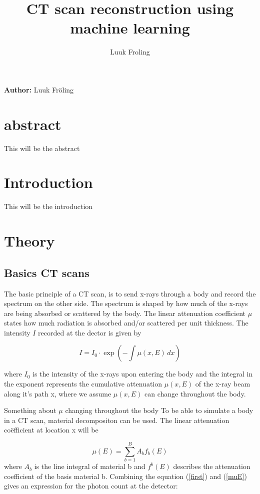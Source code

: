 \documentclass[9pt,Preprint]{lapreprint}
\title{CT scan reconstruction using machine learning}
\author[]{Luuk Froling}
\begin{document}
\maketitle


\textbf{Author:} Luuk Fröling

\section{abstract}

This will be the abstract

\section{Introduction}

This will be the introduction

\section{Theory}

\subsection{Basics CT scans}

The basic principle of a CT scan, is to send x-rays through a body and record the spectrum on the other side. The spectrum is shaped by how much of the x-rays are being absorbed or scattered by the body. The linear attenuation coefficient $\mu$ states how much radiation is absorbed and/or scattered per unit thickness. The intensity $I$ recorded at the dector is given by

\begin{equation}
\label{first }
I = I_0 \cdot \exp\left(-\int \mu(x, E) \, dx\right)
\end{equation}

where $I_0$ is the intensity of the x-rays upon entering the body and the integral in the exponent represents the cumulative attenuation $\mu(x, E)$ of the x-ray beam along it's path x, where we assume $\mu(x, E)$ can change throughout the body.

Something about $\mu$ changing throughout the body
To be able to simulate a body in a CT scan, material decompositon \parencite{mechlem2018joint} can be used. The linear attenuation coëfficient at location x will be

\begin{equation}
\label{muE}
\mu(E) = \sum_{b=1}^{B} A_b f_b(E)
\end{equation}
where $A_b$ is the line integral of material b and $f^b(E)$ describes the attenuation coefficient of the basis material b. Combining the equation (\ref{first}) and (\ref{muE}) gives an expression for the photon count at the detector:
\end{document}
